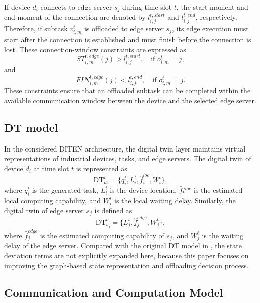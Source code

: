 \documentclass[conference]{IEEEtran}
\begin{document}
If device $d_i$ connects to edge server $s_j$ during time slot $t$, the start moment and end moment of the connection are denoted by $l_{i,j}^{t,start}$ and $l_{i,j}^{t,end}$, respectively. Therefore, if subtask $v_{i,m}^t$ is offloaded to edge server $s_j$, its edge execution must start after the connection is established and must finish before the connection is lost. These connection-window constraints are expressed as
\begin{equation}
ST_{i,m}^{t,edge}(j)>l_{i,j}^{t,start},
\quad \text{if } o_{i,m}^t=j,
\end{equation}
and
\begin{equation}
FIN_{i,m}^{t,edge}(j)<l_{i,j}^{t,end},
\quad \text{if } o_{i,m}^t=j.
\end{equation}
These constraints ensure that an offloaded subtask can be completed within the available communication window between the device and the selected edge server.
\subsection{DT model}

In the considered DITEN architecture, the digital twin layer maintains virtual representations of industrial devices, tasks, and edge servers. The digital twin of device $d_i$ at time slot $t$ is represented as
\begin{equation}
\mathrm{DT}_{d_i}^{t}
=
\{q_i^t,L_i^t,\hat{f}_i^{loc},W_i^t\},
\end{equation}
where $q_i^t$ is the generated task, $L_i^t$ is the device location, $\hat{f}i^{loc}$ is the estimated local computing capability, and $W_i^t$ is the local waiting delay. Similarly, the digital twin of edge server $s_j$ is defined as
\begin{equation}
\mathrm{DT}_{s_j}^{t}
=
\{L_j^{s},\hat{f}_j^{edge},W_j^t\},
\end{equation}
where $\hat{f}_j^{edge}$ is the estimated computing capability of $s_j$, and $W_j^t$ is the waiting delay of the edge server. Compared with the original DT model in \cite{10892268}, the state deviation terms are not explicitly expanded here, because this paper focuses on improving the graph-based state representation and offloading decision process.
\subsection{Communication and Computation Model}
\end{document}
